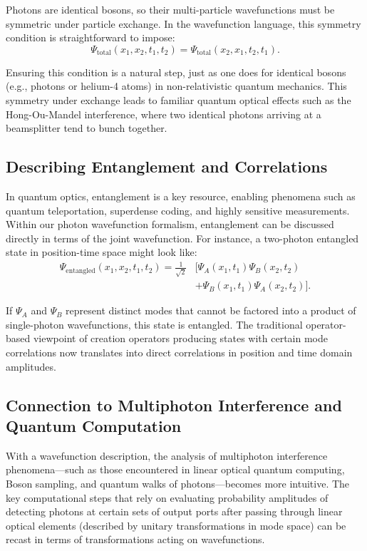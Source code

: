 \documentclass[aps,prl,twocolumn,showpacs,showkeys,superscriptaddress,amsmath,amssymb]{revtex4-2}
\begin{document}
Photons are identical bosons, so their multi-particle wavefunctions must be symmetric under particle exchange. In the wavefunction language, this symmetry condition is straightforward to impose:
\begin{equation}
\Psi_{\text{total}}(x_1,x_2,t_1,t_2) = \Psi_{\text{total}}(x_2,x_1,t_2,t_1).
\end{equation}

Ensuring this condition is a natural step, just as one does for identical bosons (e.g., photons or helium-4 atoms) in non-relativistic quantum mechanics. This symmetry under exchange leads to familiar quantum optical effects such as the Hong-Ou-Mandel interference, where two identical photons arriving at a beamsplitter tend to bunch together.

\subsection{Describing Entanglement and Correlations}

In quantum optics, entanglement is a key resource, enabling phenomena such as quantum teleportation, superdense coding, and highly sensitive measurements. Within our photon wavefunction formalism, entanglement can be discussed directly in terms of the joint wavefunction. For instance, a two-photon entangled state in position-time space might look like:
\begin{equation}
\begin{split}
\Psi_{\text{entangled}}(x_1,x_2,t_1,t_2) = \frac{1}{\sqrt{2}} & \bigl[\Psi_A(x_1,t_1)\Psi_B(x_2,t_2) \\
& + \Psi_B(x_1,t_1)\Psi_A(x_2,t_2)\bigr].
\end{split}
\end{equation}

If $\Psi_A$ and $\Psi_B$ represent distinct modes that cannot be factored into a product of single-photon wavefunctions, this state is entangled. The traditional operator-based viewpoint of creation operators producing states with certain mode correlations now translates into direct correlations in position and time domain amplitudes.

\subsection{Connection to Multiphoton Interference and Quantum Computation}

With a wavefunction description, the analysis of multiphoton interference phenomena—such as those encountered in linear optical quantum computing, Boson sampling, and quantum walks of photons—becomes more intuitive. The key computational steps that rely on evaluating probability amplitudes of detecting photons at certain sets of output ports after passing through linear optical elements (described by unitary transformations in mode space) can be recast in terms of transformations acting on wavefunctions.
\end{document}
